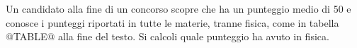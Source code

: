 Un candidato alla fine di un concorso scopre che ha un 
punteggio medio di 50 e conosce i punteggi riportati in tutte 
le materie, tranne fisica, come in tabella 
@TABLE@ alla fine del testo.
Si calcoli quale punteggio ha avuto in fisica.